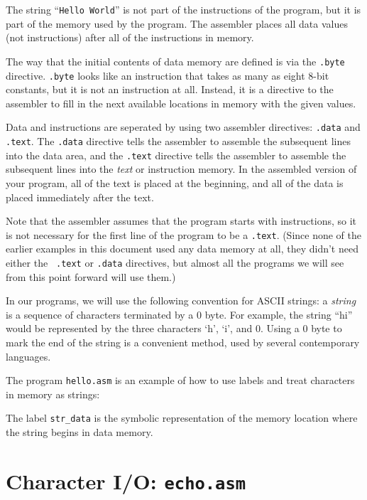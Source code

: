 The string ``{\tt Hello World}'' is not part of the instructions of
the program, but it is part of the memory used by the program.  The
assembler places all data values (not instructions) after all of the
instructions in memory.

The way that the initial contents of data memory are defined is via
the {\tt .byte} directive.  {\tt .byte} looks like an instruction that
takes as many as eight 8-bit constants, but it is not an instruction
at all.  Instead, it is a directive to the assembler to fill in the
next available locations in memory with the given values.

Data and instructions are seperated by using two assembler directives: 
{\tt .data} and {\tt .text}.  The {\tt .data} directive tells the
assembler to assemble the subsequent lines into the data area, and the
{\tt .text} directive tells the assembler to assemble the subsequent
lines into the {\em text} or instruction memory.  In the assembled
version of your program, all of the text is placed at the beginning,
and all of the data is placed immediately after the text.

Note that the assembler assumes that the program starts with
instructions, so it is not necessary for the first line of the program
to be a {\tt .text}.  (Since none of the earlier examples in this
document used any data memory at all, they didn't need either the {\tt
.text} or {\tt .data} directives, but almost all the programs we will
see from this point forward will use them.)
 
In our programs, we will use the following convention for ASCII
strings:  a {\em string} is a sequence of characters terminated by a 0
byte.  For example, the string ``hi'' would be represented by the
three characters `h', `i', and 0.  Using a 0 byte to mark the end of
the string is a convenient method, used by several contemporary
languages.

The program {\tt hello.asm} is an example of how to use labels and
treat characters in memory as strings:



The label {\tt str\_data} is the symbolic representation of the
memory location where the string begins in data memory.

\section{Character I/O: {\tt echo.asm}}
\label{echo-sec}

